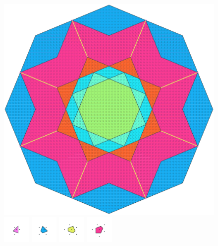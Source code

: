 \documentclass[text.tex]{subfiles}
\begin{document}
\clearpage
\pagestyle{fancy}
\fancyhf{}
\begin{figure}[h!]
\centering
\includegraphics[width=1\textwidth]{img/results/octagon/octagon_141421_(-1_1alpha_1).pdf}
\includegraphics[width=0.12\textwidth]{img/results/octagon/octagon_141421_(-1_1alpha_1)_001.pdf}
\includegraphics[width=0.12\textwidth]{img/results/octagon/octagon_141421_(-1_1alpha_1)_002.pdf}
\includegraphics[width=0.12\textwidth]{img/results/octagon/octagon_141421_(-1_1alpha_1)_003.pdf}
\includegraphics[width=0.12\textwidth]{img/results/octagon/octagon_141421_(-1_1alpha_1)_004.pdf}

\end{figure}
\end{document}
